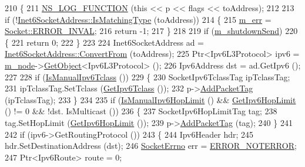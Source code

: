 \begin{DoxyCode}
210 \{
211   \hyperlink{log-macros-disabled_8h_a90b90d5bad1f39cb1b64923ea94c0761}{NS\_LOG\_FUNCTION} (\textcolor{keyword}{this} << p << flags << toAddress);
212 
213   \textcolor{keywordflow}{if} (!\hyperlink{classns3_1_1Inet6SocketAddress_a4d928c54affbfb530a12076d6d7e0540}{Inet6SocketAddress::IsMatchingType} (toAddress))
214     \{
215       \hyperlink{classns3_1_1Ipv6RawSocketImpl_afabd1db84eac91197faac4f4852d8681}{m\_err} = \hyperlink{classns3_1_1Socket_ada1328c5ae0c28cb2a982caf8f6d6ccaa4b98dd50740861229f8e03bcc36d379b}{Socket::ERROR\_INVAL};
216       \textcolor{keywordflow}{return} -1;
217     \}
218 
219   \textcolor{keywordflow}{if} (\hyperlink{classns3_1_1Ipv6RawSocketImpl_a974dfa7bfc98a6c070d74b42dbc1cb30}{m\_shutdownSend})
220     \{
221       \textcolor{keywordflow}{return} 0;
222     \}
223 
224   Inet6SocketAddress ad = \hyperlink{classns3_1_1Inet6SocketAddress_a2177c66e1bcf17c85dcffb9d2a971f5a}{Inet6SocketAddress::ConvertFrom} (toAddress);
225   Ptr<Ipv6L3Protocol> ipv6 = \hyperlink{classns3_1_1Ipv6RawSocketImpl_a2afa14d1f4c1f729c989c00e3ad350fb}{m\_node}->\hyperlink{classns3_1_1Object_a13e18c00017096c8381eb651d5bd0783}{GetObject}<Ipv6L3Protocol> ();
226   Ipv6Address dst = ad.GetIpv6 ();
227 
228   \textcolor{keywordflow}{if} (\hyperlink{classns3_1_1Socket_a83858f6116bcdabecf1b63b37514ec8d}{IsManualIpv6Tclass} ())
229     \{
230       SocketIpv6TclassTag ipTclassTag;
231       ipTclassTag.SetTclass (\hyperlink{classns3_1_1Socket_aed62162f0b5f322b1fa23b7350c3c2ce}{GetIpv6Tclass} ());
232       p->\hyperlink{classns3_1_1Packet_a7400b8655852f5271c5957250d0141af}{AddPacketTag} (ipTclassTag);
233     \}
234 
235   \textcolor{keywordflow}{if} (\hyperlink{classns3_1_1Socket_af537e44bad2f67bffe7ef6c1c86c2459}{IsManualIpv6HopLimit} () && \hyperlink{classns3_1_1Socket_ad78033887757bda28f40f4ab1f0620d0}{GetIpv6HopLimit} () != 0 && !dst.
      IsMulticast ())
236     \{
237       SocketIpv6HopLimitTag tag;
238       tag.SetHopLimit (\hyperlink{classns3_1_1Socket_ad78033887757bda28f40f4ab1f0620d0}{GetIpv6HopLimit} ());
239       p->\hyperlink{classns3_1_1Packet_a7400b8655852f5271c5957250d0141af}{AddPacketTag} (tag);
240     \}
241 
242   \textcolor{keywordflow}{if} (ipv6->GetRoutingProtocol ())
243     \{
244       Ipv6Header hdr;
245       hdr.SetDestinationAddress (dst);
246       \hyperlink{classns3_1_1Socket_ada1328c5ae0c28cb2a982caf8f6d6cca}{SocketErrno} err = \hyperlink{classns3_1_1Socket_ada1328c5ae0c28cb2a982caf8f6d6ccaaa7eb006d73c5ad0117c5591fcb3469f7}{ERROR\_NOTERROR};
247       Ptr<Ipv6Route> route = 0;

\end{DoxyCode}

